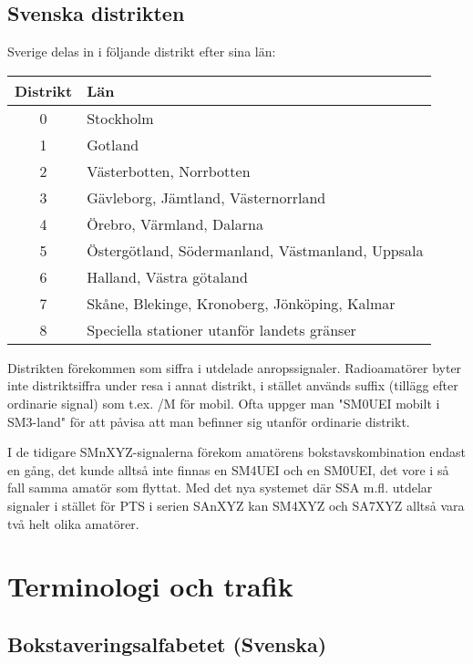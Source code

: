 \subsection{Svenska distrikten}

Sverige delas in i följande distrikt efter sina län:

\begin{center}
\begin{tabular}{cl}
	\textbf{Distrikt} & \textbf{Län}                                     \\ \hline %
	      0        & Stockholm                                        \\
	      1        & Gotland                                          \\
	      2        & Västerbotten, Norrbotten                         \\
	      3        & Gävleborg, Jämtland, Västernorrland              \\
	      4        & Örebro, Värmland, Dalarna                        \\
	      5        & Östergötland, Södermanland, Västmanland, Uppsala \\
	      6        & Halland, Västra götaland                         \\
	      7        & Skåne, Blekinge, Kronoberg, Jönköping, Kalmar    \\
	      8        & Speciella stationer utanför landets gränser
\end{tabular}
\end{center}
Distrikten förekommen som siffra i utdelade anropssignaler. Radioamatörer byter inte distriktsiffra under resa i annat distrikt, i stället används suffix (tillägg efter ordinarie signal) som t.ex. /M för mobil. Ofta uppger man "SM0UEI mobilt i SM3-land" för att påvisa att man befinner sig utanför ordinarie distrikt.

I de tidigare SMnXYZ-signalerna förekom amatörens bokstavskombination endast en gång, det kunde alltså inte finnas en SM4UEI och en SM0UEI, det vore i så fall samma amatör som flyttat. Med det nya systemet där SSA m.fl. utdelar signaler i stället för PTS i serien SAnXYZ kan SM4XYZ och SA7XYZ alltså vara två helt olika amatörer.
\section{Terminologi och trafik}

\subsection{Bokstaveringsalfabetet (Svenska)}

